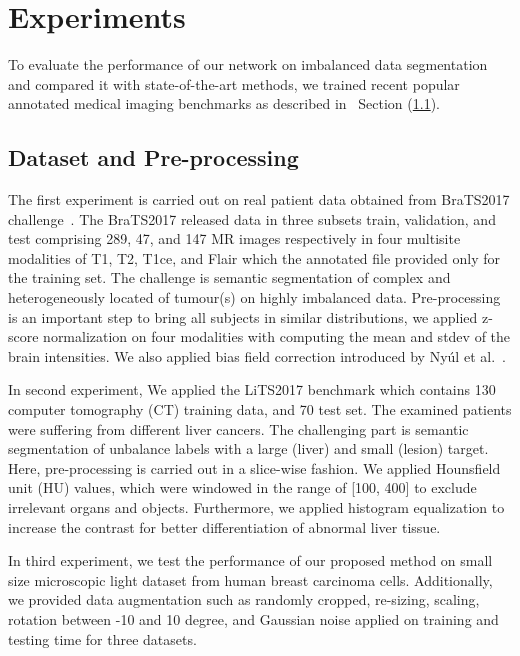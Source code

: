 \documentclass[10pt,twocolumn,letterpaper]{article}
\begin{document}
\section{Experiments}\label{experiment}
To evaluate the performance of our network on imbalanced data segmentation and compared it with state-of-the-art methods, we trained recent popular annotated medical imaging benchmarks as described in~ Section (\ref{datasets}).

\subsection{Dataset and Pre-processing}\label{datasets}

The first experiment is carried out on real patient data obtained from BraTS2017 challenge~\cite{Menze2014,Bakasnature2017,Bakastcg2017,Bakaslgg2017}.
The BraTS2017 released data in three subsets train, validation, and test comprising 289, 47, and 147 MR images respectively in four multisite modalities of T1, T2, T1ce, and Flair which the annotated file provided only for the training set. The challenge is semantic segmentation of complex and heterogeneously located of tumour(s) on highly imbalanced data. Pre-processing is an important step to bring all subjects in similar distributions, we applied z-score normalization on four modalities with computing the mean and stdev of the brain intensities. We also applied bias field correction introduced by Ny{\'u}l et al.~\cite{nyul2000new}.

In second experiment, We applied the LiTS2017 benchmark which contains 130 computer tomography (CT) training data, and 70 test set. The examined patients were suffering from different liver cancers. The challenging part is semantic segmentation of unbalance labels with a large (liver) and small (lesion) target. Here, pre-processing is carried out in a slice-wise fashion. We applied Hounsfield unit (HU) values, which were windowed in the range of [100, 400] to exclude irrelevant organs and objects. Furthermore, we applied histogram equalization to increase the contrast for better differentiation of abnormal liver tissue.

In third experiment, we test the performance of our proposed method on small size microscopic light dataset from human breast carcinoma cells. %
Additionally, we provided data augmentation such as randomly cropped, re-sizing, scaling, rotation between -10 and 10 degree, and Gaussian noise applied on training and testing time for three datasets.
\end{document}

